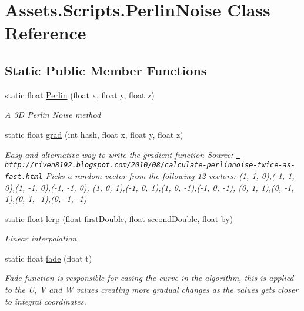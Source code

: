 \hypertarget{class_assets_1_1_scripts_1_1_perlin_noise}{}\section{Assets.\+Scripts.\+Perlin\+Noise Class Reference}
\label{class_assets_1_1_scripts_1_1_perlin_noise}
\subsection*{Static Public Member Functions}
\begin{DoxyCompactItemize}
\item 
static float \mbox{\hyperlink{class_assets_1_1_scripts_1_1_perlin_noise_a126a47fd87c2c24d18a906ac6c60c1a4}{Perlin}} (float x, float y, float z)
\begin{DoxyCompactList}\small\item\em A 3D Perlin Noise method \end{DoxyCompactList}\item 
static float \mbox{\hyperlink{class_assets_1_1_scripts_1_1_perlin_noise_acf602f5adb436883f20184ec6020e8b7}{grad}} (int hash, float x, float y, float z)
\begin{DoxyCompactList}\small\item\em Easy and alternative way to write the gradient function Source\+: \href{http://riven8192.blogspot.com/2010/08/calculate-perlinnoise-twice-as-fast.html}{\texttt{ http\+://riven8192.\+blogspot.\+com/2010/08/calculate-\/perlinnoise-\/twice-\/as-\/fast.\+html}} Picks a random vector from the following 12 vectors\+: (1, 1, 0),(-\/1, 1, 0),(1, -\/1, 0),(-\/1, -\/1, 0), (1, 0, 1),(-\/1, 0, 1),(1, 0, -\/1),(-\/1, 0, -\/1), (0, 1, 1),(0, -\/1, 1),(0, 1, -\/1),(0, -\/1, -\/1) \end{DoxyCompactList}\item 
static float \mbox{\hyperlink{class_assets_1_1_scripts_1_1_perlin_noise_a0a9585c89676dbed37137fc71b11fec7}{lerp}} (float first\+Double, float second\+Double, float by)
\begin{DoxyCompactList}\small\item\em Linear interpolation \end{DoxyCompactList}\item 
static float \mbox{\hyperlink{class_assets_1_1_scripts_1_1_perlin_noise_a6814246a684b081178e01c960a4edd96}{fade}} (float t)
\begin{DoxyCompactList}\small\item\em Fade function is responsible for easing the curve in the algorithm, this is applied to the U, V and W values creating more gradual changes as the values gets closer to integral coordinates. \end{DoxyCompactList}\end{DoxyCompactItemize}
